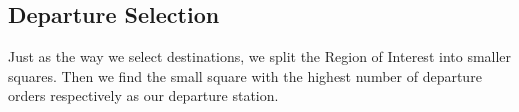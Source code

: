 \documentclass{llncs}
\begin{document}
\subsection{Departure Selection}
Just as the way we select destinations, we split the Region of Interest into smaller squares. Then we find the small square with the highest number of departure orders respectively as our departure station.
\begin{figure}
    \centering
\end{figure}
\end{document}
